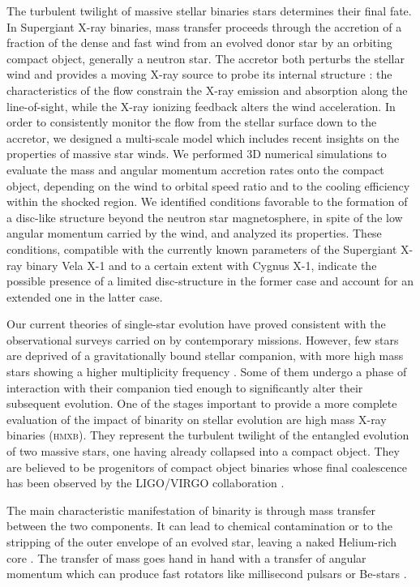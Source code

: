 \documentclass[a4paper,fleqn,usenatbib]{mnras}
\makeatletter
\newcommand*{\hmxb}{\textsc{hmxb}\@\xspace}
\newcommand*{\eg}{e.g.\@\xspace}
\makeatother
\begin{document}
The turbulent twilight of massive stellar binaries stars determines their final fate. In Supergiant X-ray binaries, mass transfer proceeds through the accretion of a fraction of the dense and fast wind from an evolved donor star by an orbiting compact object, generally a neutron star. The accretor both perturbs the stellar wind and provides a moving X-ray source to probe its internal structure : the characteristics of the flow constrain the X-ray emission and absorption along the line-of-sight, while the X-ray ionizing feedback alters the wind acceleration. In order to consistently monitor the flow from the stellar surface down to the accretor, we designed a multi-scale model which includes recent insights on the properties of massive star winds. We performed 3D numerical simulations to evaluate the mass and angular momentum accretion rates onto the compact object, depending on the wind to orbital speed ratio and to the cooling efficiency within the shocked region. We identified conditions favorable to the formation of a disc-like structure beyond the neutron star magnetosphere, in spite of the low angular momentum carried by the wind, and analyzed its properties. These conditions, compatible with the currently known parameters of the Supergiant X-ray binary Vela X-1 and to a certain extent with Cygnus X-1, indicate the possible presence of a limited disc-structure in the former case and account for an extended one in the latter case.


Our current theories of single-star evolution have proved consistent with the observational surveys carried on by contemporary missions. However, few stars are deprived of a gravitationally bound stellar companion, with more high mass stars showing a higher multiplicity frequency \citep{Duchene2013}. Some of them undergo a phase of interaction with their companion tied enough to significantly alter their subsequent evolution. One of the stages important to provide a more complete evaluation of the impact of binarity on stellar evolution are high mass X-ray binaries (\hmxb). They represent the turbulent twilight of the entangled evolution of two massive stars, one having already collapsed into a compact object. They are believed to be progenitors of compact object binaries whose final coalescence has been observed by the LIGO/VIRGO collaboration \citep{Abbott2016a}.

The main characteristic manifestation of binarity is through mass transfer between the two components. It can lead to chemical contamination \citep[\eg in the case of Barium and Carbon-enhanced metal-poor stars][]{Boffin2014,Masseron2009} or to the stripping of the outer envelope of an evolved star, leaving a naked Helium-rich core \citep[\eg for some hot subdwarf stars][]{XXX Podsiadlowski2010, Mereghetti2014 or Han? XXX}. The transfer of mass goes hand in hand with a transfer of angular momentum which can produce fast rotators like millisecond pulsars \citep{XXX Podsiadlowski2010? XXX} or Be-stars \citep{XXX Podsiadlowski2010? XXX}.
\end{document}
